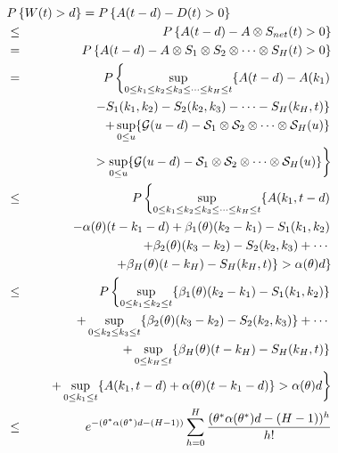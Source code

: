 \documentclass[letterpaper]{IEEEtran}
\begin{document}
\begin{eqnarray} 
\lefteqn{P\left\{ W(t) > d \right\} = P\left\{ A(t-d) - D(t) > 0 \right\}} \nonumber\\
&\le& P\left\{ A(t-d) - A\otimes S_{net}(t) > 0 \right\} \nonumber\\
&=& P\left\{ A(t-d) - A\otimes S_1\otimes S_2 \otimes \cdots \otimes S_H(t) > 0 \right\}\\
&=& P\left\{\sup_{0 \le k_1 \le k_2 \le k_3 \le \cdots \le k_H \le t} \{A(t-d) - A (k_1) \right. \nonumber\\
&& \ \ \ \ \ \ \ \ \ \ \left. -  S_1(k_1,k_2)  - S_2(k_2,k_3) - \cdots - S_H (k_H,t) \} \right. \nonumber\\
&& \ \ \ \ \ \ \ \ \ \ \left.  + \sup_{0 \le u}\{{\cal G}(u-d)-{\cal S}_{1}\otimes{\cal S}_{2}\otimes \cdots \otimes {\cal S}_{H}(u)\} \right. \nonumber\\
&& \ \ \ \ \ \ \ \ \ \ \ \ \ \ \ \left. > \sup_{0 \le u}\{{\cal G}(u-d)-{\cal S}_{1}\otimes{\cal S}_{2}\otimes \cdots \otimes {\cal S}_{H}(u)\} \right\}\nonumber\\ 
&\le& P\left\{\sup_{0 \le k_1 \le k_2 \le k_3 \le \cdots \le k_H \le t} \{A(k_1,t-d)  \right. \nonumber\\
&&  \ \ \ \ \ \ \ \ \left. - \alpha(\theta)(t-k_1-d) + \beta_1(\theta)(k_2-k_1) -  S_1(k_1,k_2) \right. \nonumber\\
&&  \ \ \ \ \ \ \ \ \ \ \ \ \ \ \left. + \beta_2(\theta)(k_3-k_2)  - S_2(k_2,k_3) + \cdots  \right. \nonumber\\
&&  \ \ \ \ \ \ \ \ \ \ \ \ \ \ \ \ \ \ \ \ \left. + \beta_H(\theta)(t-k_H) - S_H (k_H,t) \}  > \alpha(\theta)d \right\} \nonumber\\
&\le& P\left\{ \sup_{0 \le k_1 \le k_2 \le t}\{\beta_1(\theta)(k_2-k_1)- S_1(k_1,k_2)\} \right. \nonumber\\
&& \ \ \ \ \ \ \ \ \left. + \sup_{0 \le k_2 \le k_3 \le t} \{\beta_2(\theta)(k_3-k_2)- S_2(k_2, k_3)\} + \cdots \right. \nonumber\\
&& \ \ \ \ \ \ \ \ \ \ \left. + \sup_{0 \le k_H \le t} \{ \beta_H(\theta)(t-k_H) - S_H(k_H, t)\} \right. \nonumber\\
&& \ \ \ \ \left. + \sup_{0 \le k_1 \le t} \{A(k_1,t-d) + \alpha(\theta)(t-k_1-d) \} > \alpha(\theta)d \right\} \nonumber\\
&\le& e^{-(\theta^*\alpha(\theta^*)d-(H-1))}\sum_{h=0}^{H}{\frac{(\theta^*\alpha(\theta^*)d-(H-1))^h}{h!}} \label{snetd}
\end{eqnarray}
\normalsize
\end{document}
